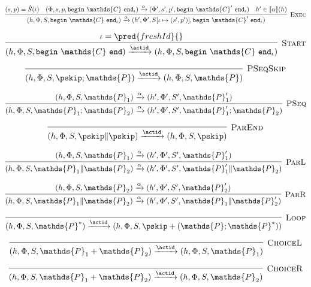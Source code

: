\[
\infer[\textsc{Exec}]
{
	 (h, \Phi, S, \mathtt{begin}\ \mathds{C}\ \mathtt{end}_\iota)
	\xrightarrow{\alpha}
	(h', \Phi', S[\iota \mapsto (s', p')], \mathtt{begin}\ \mathds{C}'\ \mathtt{end}_\iota)
}
{
	(s, p) = \hat{S}(\iota) &
	(\Phi, s, p, \mathtt{begin}\ \mathds{C}\ \mathtt{end}_\iota)
	\xrightarrow{\alpha}
	(\Phi', s', p', \mathtt{begin}\ \mathds{C}'\ \mathtt{end}_\iota) &
	h' \in \llbracket \alpha \rrbracket (h)
}
\]

\[
\infer[\textsc{Start}]
{
	(h, \Phi, S, \mathtt{begin}\ \mathds{C}\ \mathtt{end})
	\xrightarrow{\actid}
	(h, \Phi, S, \mathtt{begin}\ \mathds{C}\ \mathtt{end}_\iota)
}
{
	\iota = \pred{freshId}{}
}
\]

\[
\infer[\textsc{PSeqSkip}]
{
	 (h, \Phi, S, \pskip; \mathds{P})
	\xrightarrow{\actid}
	(h, \Phi, S, \mathds{P})
}
{}
\]

\[
\infer[\textsc{PSeq}]
{
	 (h, \Phi, S, \mathds{P}_1; \mathds{P}_2)
	\xrightarrow{\alpha}
	(h', \Phi', S', \mathds{P}_1'; \mathds{P}_2)
}
{
	 (h, \Phi, S, \mathds{P}_1)
	\xrightarrow{\alpha}
	(h', \Phi', S', \mathds{P}_1')
}
\]

\[
\infer[\textsc{ParEnd}]
{
	 (h, \Phi, S, \pskip \| \pskip)
	\xrightarrow{\actid}
	(h, \Phi, S, \pskip)
}
{}
\]

\[
\infer[\textsc{ParL}]
{
	 (h, \Phi, S, \mathds{P}_1 \| \mathds{P}_2)
	\xrightarrow{\alpha}
	(h', \Phi', S', \mathds{P}_1' \| \mathds{P}_2)
}
{
	 (h, \Phi, S, \mathds{P}_1)
	\xrightarrow{\alpha}
	(h', \Phi', S', \mathds{P}_1')
}
\]

\[
\infer[\textsc{ParR}]
{
	 (h, \Phi, S, \mathds{P}_1 \| \mathds{P}_2)
	\xrightarrow{\alpha}
	(h', \Phi', S', \mathds{P}_1 \| \mathds{P}_2')
}
{
	 (h, \Phi, S, \mathds{P}_2)
	\xrightarrow{\alpha}
	(h', \Phi', S', \mathds{P}_2')
}
\]

\[
\infer[\textsc{Loop}]
{
	 (h, \Phi, S, \mathds{P}^*)
	\xrightarrow{\actid}
	(h, \Phi, S, \pskip + (\mathds{P} ; \mathds{P}^*))
}
{}
\]

\[
\infer[\textsc{ChoiceL}]
{
	 (h, \Phi, S, \mathds{P}_1 + \mathds{P}_2)
	\xrightarrow{\actid}
	(h, \Phi, S, \mathds{P}_1)
}
{}
\]

\[
\infer[\textsc{ChoiceR}]
{
	 (h, \Phi, S, \mathds{P}_1 + \mathds{P}_2)
	\xrightarrow{\actid}
	(h, \Phi, S, \mathds{P}_2)
}
{}
\]
